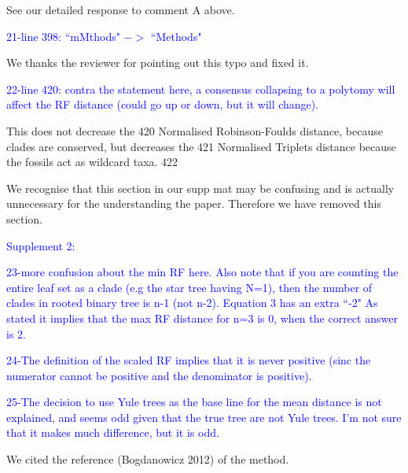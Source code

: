 \documentclass[11pt]{letter}
\begin{document}
\begin{letter}{}
See our detailed response to comment A above.


\textcolor{blue}{21-line 398: ``mMthods" $->$ ``Methods"}

We thanks the reviewer for pointing out this typo and fixed it.

\textcolor{blue}{22-line 420: contra the statement here, a consensus collapsing to a polytomy will affect the RF distance (could go up or down, but it will change).}


This does not decrease the 420
Normalised Robinson-Foulds distance, because clades are conserved, but decreases the 421
Normalised Triplets distance because the fossils act as wildcard taxa. 422





We recognise that this section in our supp mat may be confusing and is actually unnecessary for the understanding the paper. Therefore we have removed this section. %

\textcolor{blue}{Supplement 2:}

\textcolor{blue}{23-more confusion about the min RF here. Also note that if you are counting the entire leaf set as a clade (e.g the star tree having N=1), then the number of clades in rooted binary tree is n-1 (not n-2). Equation 3 has an extra ``-2" As stated it implies that the max RF distance for n=3 is 0, when the correct answer is 2.}



\textcolor{blue}{24-The definition of the scaled RF implies that it is never positive (sinc the numerator cannot be positive and the denominator is positive).}



\textcolor{blue}{25-The decision to use Yule trees as the base line for the mean distance is not explained, and seems odd given that the true tree are not Yule trees. I'm not sure that it makes much difference, but it is odd.}

We cited the reference (Bogdanowicz 2012) of the method.


\end{letter}
\end{document}
